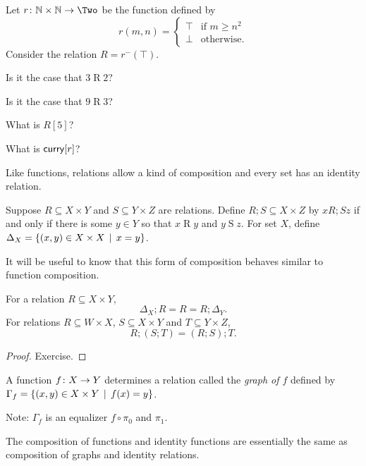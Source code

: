 \begin{exercises}
	Let $\fromto r{\NN\times\NN}\Two$ be the function defined by \[r(m,n) = \begin{cases}
	\top & \text{if $m\geq n^2$}\\
	\bot & \text{otherwise}.
	\end{cases}
	\]
	Consider the relation $R = r^{-}(\top)$.
	\begin{firstexercise}
		\item Is it the case that $3\mathrel{R} 2$?
		\item Is it the case that $9\mathrel{R} 3$?
		\item What is $R[5]$?
		\item What is $\mathord{\textsf{curry}}[r]$?
	\end{firstexercise}
\end{exercises}

Like functions, relations allow a kind of composition and every set has an identity relation.

\begin{defn}
	Suppose $R\subseteq X\times Y$ and $S\subseteq Y\times Z$ are relations. 
	Define $R;S\subseteq X\times Z$ by $x\mathrel{R;S}z$ if and only if there is some $y\in Y$ so that $x\mathrel{R}y$ and $y\mathrel{S}z$.
	For set $X$, define $\Delta_X = \{(x,y)\in X\times X\,\mid\, x=y\}$.	
\end{defn}

It will be useful to know that this form of composition behaves similar to function composition.

\begin{lemma}
	For a relation $R\subseteq X\times Y$, 
	\[\Delta_X;R = R = R;\Delta_Y.\] 
	For relations $R\subseteq W\times X$, $S\subseteq X\times Y$ and $T\subseteq Y\times Z$,
	\[R;(S;T) = (R;S);T.\]
	
	\begin{proof}
		Exercise.
	\end{proof}
\end{lemma}

\begin{defn}
	A function ${f}\colon{X}\to{Y}$ determines a relation called the \emph{graph of $f$} defined by 
	$\Gamma_f = \{(x,y)\in X\times Y\,\mid\, f(x)=y\}$.
	
	Note: $\Gamma_f$ is an equalizer $f\circ\pi_0$ and $\pi_1$.
\end{defn}

The composition of functions and identity functions are essentially the same as composition of graphs and identity relations.

